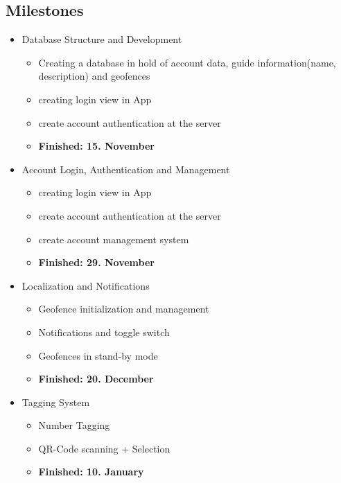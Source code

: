 \documentclass[12pt]{article}
\theoremstyle{definition}
\begin{document}
\subsection{Milestones}
\begin{itemize}
\large \item Database Structure and Development
\begin{itemize}
    \normalsize
    \item Creating a database in hold of account data, guide information(name, description) and geofences
    \item creating login view in App
    \item create account authentication at the server
    \item \textbf{Finished: 15. November}
\end{itemize}
\item Account Login, Authentication and Management
\begin{itemize}
    \normalsize
    \item creating login view in App
    \item create account authentication at the server
    \item create account management system
    \item \textbf{Finished: 29. November}
\end{itemize}
\item Localization and Notifications
\begin{itemize}
    \normalsize
    \item Geofence initialization and management
    \item Notifications and toggle switch
    \item Geofences in stand-by mode
    \item \textbf{Finished: 20. December}
\end{itemize}
\item Tagging System
\begin{itemize}
    \normalsize
    \item Number Tagging
    \item QR-Code scanning + Selection
    \item \textbf{Finished: 10. January}
    

\end{itemize}
\end{itemize}
\end{document}
